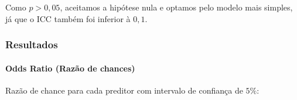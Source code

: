 \documentclass[
]{article}
\let\oldparagraph\paragraph
\renewcommand{\paragraph}[1]{\oldparagraph{#1}\mbox{}}
\newenvironment{Shaded}{\begin{snugshade}}{\end{snugshade}}
\newcommand{\AttributeTok}[1]{\textcolor[rgb]{0.40,0.45,0.13}{#1}}
\newcommand{\DecValTok}[1]{\textcolor[rgb]{0.68,0.00,0.00}{#1}}
\newcommand{\FunctionTok}[1]{\textcolor[rgb]{0.28,0.35,0.67}{#1}}
\newcommand{\NormalTok}[1]{\textcolor[rgb]{0.00,0.23,0.31}{#1}}
\newcommand{\OtherTok}[1]{\textcolor[rgb]{0.00,0.23,0.31}{#1}}
\newcommand{\SpecialCharTok}[1]{\textcolor[rgb]{0.37,0.37,0.37}{#1}}
\begin{document}
Como \(p > 0,05\), aceitamos a hipótese nula e optamos pelo modelo mais
simples, já que o ICC também foi inferior à \(0,1\).

\hypertarget{resultados}{%
\subsubsection{Resultados}\label{resultados}}

\hypertarget{odds-ratio-razuxe3o-de-chances}{%
\paragraph{Odds Ratio (Razão de
chances)}\label{odds-ratio-razuxe3o-de-chances}}

Razão de chance para cada preditor com intervalo de confiança de
\(5\%\):

\begin{Shaded}
\end{Shaded}
\end{document}
